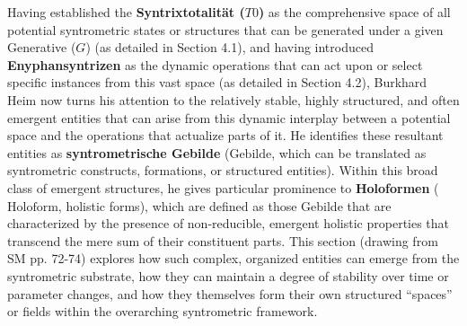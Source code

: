 \documentclass[12pt]{article}
\newcommand{\q}[1]{\enquote{#1}}
\newcommand{\syntrixtotalitaet}{T0}
\newcommand{\generative}{G}
\newcommand{\syntrometrischesGebilde}{\text{Gebilde}}
\newcommand{\holoform}{\text{Holoform}}
\begin{document}
Having established the \textbf{Syntrixtotalität (\( \syntrixtotalitaet \))} as the comprehensive space of all potential syntrometric states or structures that can be generated under a given Generative (\( \generative \)) (as detailed in Section 4.1), and having introduced \textbf{Enyphansyntrizen} as the dynamic operations that can act upon or select specific instances from this vast space (as detailed in Section 4.2), Burkhard Heim now turns his attention to the relatively stable, highly structured, and often emergent entities that can arise from this dynamic interplay between a potential space and the operations that actualize parts of it. He identifies these resultant entities as \textbf{syntrometrische Gebilde} (\(\syntrometrischesGebilde\), which can be translated as syntrometric constructs, formations, or structured entities). Within this broad class of emergent structures, he gives particular prominence to \textbf{Holoformen} (\(\holoform\), holistic forms), which are defined as those Gebilde that are characterized by the presence of non-reducible, emergent holistic properties that transcend the mere sum of their constituent parts. This section (drawing from SM pp. 72-74) explores how such complex, organized entities can emerge from the syntrometric substrate, how they can maintain a degree of stability over time or parameter changes, and how they themselves form their own structured \q{spaces} or fields within the overarching syntrometric framework.
\end{document}
